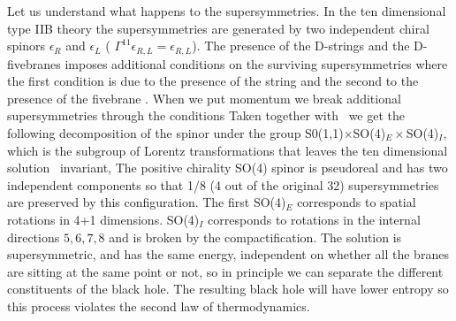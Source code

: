 Let us understand what happens to the
supersymmetries.
In  the ten dimensional type IIB theory the supersymmetries
are generated by  two independent chiral spinors $\epsilon_R$
and $\epsilon_L$ ( $\Gamma^{11} \epsilon_{R,L} =\epsilon_{R,L}$).
The presence  
of the D-strings and the D-fivebranes imposes  additional conditions
on the surviving supersymmetries
\eqn{}
where the first condition is due to  the presence of the
string and the second to the presence of the fivebrane \susydbrane .
When we put momentum we break additional supersymmetries through
the conditions 
\eqn{}
Taken together with \susyonefive\ we get the following 
decomposition of the spinor under the group
 S0(1,1)$\times$SO(4)$_E \times$SO(4)$_I$, which is the subgroup 
 of Lorentz transformations that leaves the
ten dimensional 
solution \tenfived\ invariant, 
\eqn{}
The positive chirality SO(4) spinor is pseudoreal and has two independent
components so that 1/8 (4 out of the original 32) 
 supersymmetries are preserved
by this configuration.
The first  SO(4)$_E$
corresponds
to spatial rotations in 4+1 dimensions.  SO(4)$_I$
 corresponds
to rotations in the internal directions $5,6,7,8$ and is
broken by the compactification. 
The solution is supersymmetric, and has the same energy, 
independent on whether all the branes are sitting at the
same point or not, so in principle we can separate the
different constituents of the black hole. The resulting
black hole will have lower entropy so this process 
violates the second law of thermodynamics.


